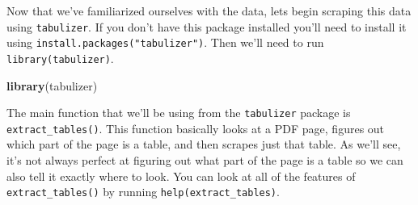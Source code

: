 \documentclass[
  12pt,
]{book}
\newenvironment{Shaded}{\begin{snugshade}}{\end{snugshade}}
\newcommand{\KeywordTok}[1]{\textcolor[rgb]{0.13,0.29,0.53}{\textbf{#1}}}
\newcommand{\NormalTok}[1]{#1}
\begin{document}
Now that we've familiarized ourselves with the data, lets begin scraping this data using \texttt{tabulizer}. If you don't have this package installed you'll need to install it using \texttt{install.packages("tabulizer")}. Then we'll need to run \texttt{library(tabulizer)}.

\begin{Shaded}
\begin{Highlighting}[]
\KeywordTok{library}\NormalTok{(tabulizer)}
\end{Highlighting}
\end{Shaded}

The main function that we'll be using from the \texttt{tabulizer} package is \texttt{extract\_tables()}. This function basically looks at a PDF page, figures out which part of the page is a table, and then scrapes just that table. As we'll see, it's not always perfect at figuring out what part of the page is a table so we can also tell it exactly where to look. You can look at all of the features of \texttt{extract\_tables()} by running \texttt{help(extract\_tables)}.
\end{document}
